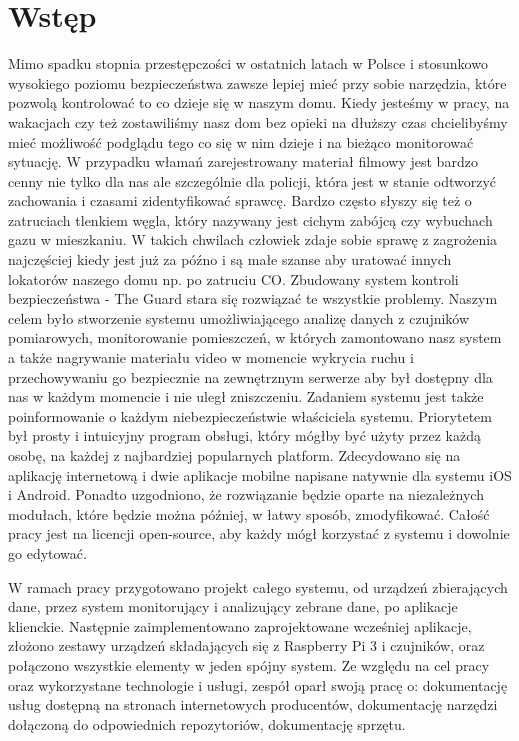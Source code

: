 \chapter{Wstęp}
Mimo spadku stopnia przestępczości w ostatnich latach w Polsce i stosunkowo wysokiego poziomu bezpieczeństwa zawsze lepiej mieć przy sobie narzędzia, które pozwolą kontrolować to co dzieje się w naszym domu. Kiedy jesteśmy w pracy, na wakacjach czy też zostawiliśmy nasz dom bez opieki na dłuższy czas chcielibyśmy mieć możliwość podglądu tego co się w nim dzieje i na bieżąco monitorować sytuację. W przypadku włamań zarejestrowany materiał filmowy jest bardzo cenny nie tylko dla nas ale szczególnie dla policji, która jest w stanie odtworzyć zachowania i czasami zidentyfikować sprawcę.  Bardzo często słyszy się też o zatruciach tlenkiem węgla, który nazywany jest cichym zabójcą czy wybuchach gazu w mieszkaniu. W takich chwilach człowiek zdaje sobie sprawę z zagrożenia najczęściej kiedy jest już za późno i są małe szanse aby uratować innych lokatorów naszego domu np. po zatruciu CO. 
Zbudowany system kontroli bezpieczeństwa - The Guard stara się rozwiązać te wszystkie problemy. Naszym celem było stworzenie systemu umożliwiającego analizę danych z czujników pomiarowych, monitorowanie pomieszczeń, w których zamontowano nasz system a także nagrywanie materiału video w momencie wykrycia ruchu i przechowywaniu go bezpiecznie na zewnętrznym serwerze aby był dostępny dla nas w każdym momencie i nie uległ zniszczeniu. Zadaniem systemu jest także poinformowanie o każdym niebezpieczeństwie właściciela systemu. Priorytetem był prosty i intuicyjny program obsługi, który mógłby być użyty przez każdą osobę, na każdej z najbardziej popularnych platform. Zdecydowano się na aplikację internetową i dwie aplikacje mobilne napisane natywnie dla systemu iOS i Android. Ponadto uzgodniono, że rozwiązanie będzie oparte na niezależnych modułach, które będzie można później, w łatwy sposób, zmodyfikować. Całość pracy jest na licencji open-source, aby każdy mógł korzystać z systemu i dowolnie go edytować.

W ramach pracy przygotowano projekt całego systemu, od urządzeń zbierających dane, przez system monitorujący i analizujący zebrane dane, po aplikacje klienckie. Następnie zaimplementowano zaprojektowane wcześniej aplikacje, złożono zestawy urządzeń składających się z Raspberry Pi 3 i czujników, oraz połączono wszystkie elementy w jeden spójny system.
Ze względu na cel pracy oraz wykorzystane technologie i usługi, zespół oparł swoją pracę o: dokumentację usług dostępną na stronach internetowych producentów, dokumentację narzędzi dołączoną do odpowiednich repozytoriów, dokumentację sprzętu.

